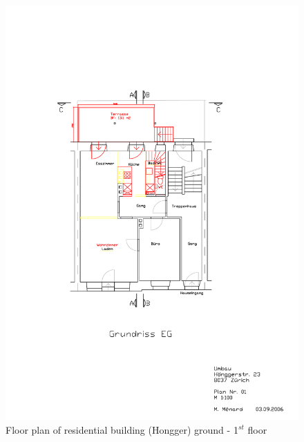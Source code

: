 \documentclass[a4paper, oneside]{discothesis}
\begin{document}
		\begin{figure}[htbp]
		\centering
		\includegraphics[scale=1.2]{Hongg_EG_Plan.pdf}
		\caption{Floor plan of residential building (Hongger) ground - 1$^{st}$ floor}
		\label{fig:hongg_eg_plan}
		\end{figure}
		
\end{document}
